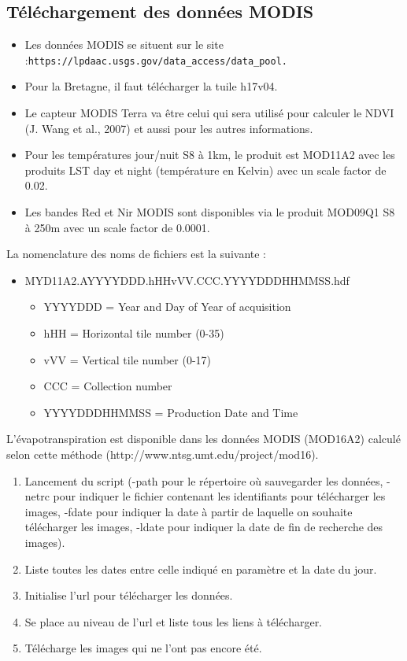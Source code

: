\documentclass[10pt,a4paper]{article}
\begin{document}
\subsection{Téléchargement des données MODIS}

\begin{itemize}
\item Les données MODIS se situent sur le site :\newline \verb!https://lpdaac.usgs.gov/data_access/data_pool.!
\item Pour la Bretagne, il faut télécharger la tuile h17v04. 
\item Le capteur MODIS Terra va être celui qui sera utilisé pour calculer le NDVI (J. Wang et al., 2007) et aussi pour les autres informations.
\item Pour les températures jour/nuit S8 à 1km, le produit est MOD11A2 avec les produits LST day et night (température en Kelvin) avec un scale factor de 0.02.
\item Les bandes Red et Nir MODIS sont disponibles via le produit MOD09Q1 S8 à 250m avec un scale factor de 0.0001.
\end{itemize}  

La nomenclature des noms de fichiers est la suivante :
\begin{itemize}
\item MYD11A2.AYYYYDDD.hHHvVV.CCC.YYYYDDDHHMMSS.hdf
\begin{itemize}
\item YYYYDDD = Year and Day of Year of acquisition
\item hHH = Horizontal tile number (0-35)
\item vVV = Vertical tile number (0-17)
\item CCC = Collection number
\item YYYYDDDHHMMSS = Production Date and Time
\end{itemize}
\end{itemize}

L'évapotranspiration est disponible dans les données MODIS (MOD16A2) calculé selon cette méthode (http://www.ntsg.umt.edu/project/mod16).

\begin{enumerate}
\item Lancement du script (-path pour le répertoire où sauvegarder les données, -netrc pour indiquer le fichier contenant les identifiants pour télécharger les images, -fdate pour indiquer la date à partir de laquelle on souhaite télécharger les images, -ldate pour indiquer la date de fin de recherche des images).
\item Liste toutes les dates entre celle indiqué en paramètre et la date du jour.
\item Initialise l'url pour télécharger les données.
\item Se place au niveau de l'url et liste tous les liens à télécharger.
\item Télécharge les images qui ne l'ont pas encore été.
\end{enumerate}
\end{document}
